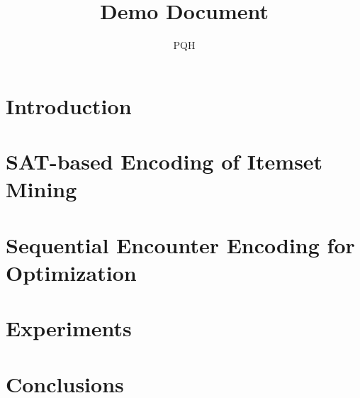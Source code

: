 \documentclass[14pt,a4paper]{report}
\title{Demo Document}
\author{PQH}
\begin{document}










\fontsize{13}{15}\selectfont

\chapter{Introduction}





\chapter{SAT-based Encoding of Itemset Mining}




\chapter{Sequential Encounter Encoding for Optimization}



\chapter{Experiments}



\chapter*{Conclusions}




\end{document}
